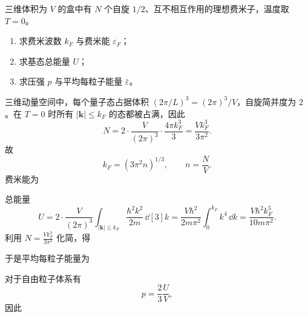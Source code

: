 \begin{question}[18分]
三维体积为 $V$ 的盒中有 $N$ 个自旋 $1/2$、互不相互作用的理想费米子，温度取 $T=0$。
\begin{enumerate}[label=(\arabic*),leftmargin=2.8em,itemsep=0.2em]
\item 求费米波数 $k_F$ 与费米能 $\varepsilon_F$；
\item 求基态总能量 $U$；
\item 求压强 $p$ 与平均每粒子能量 $\bar\varepsilon$。
\end{enumerate}
\begin{solution}

三维动量空间中，每个量子态占据体积 $(2\pi/L)^3=(2\pi)^3/V$，自旋简并度为 $2$。在 $T=0$ 时所有 $|\bm k|\le k_F$ 的态都被占满，因此
\[
N=2\cdot \frac{V}{(2\pi)^3}\cdot \frac{4\pi k_F^3}{3}
=\frac{Vk_F^3}{3\pi^2}.
\]
故
\[
k_F=(3\pi^2 n)^{1/3},\qquad n=\frac{N}{V}.
\]
费米能为

总能量
\[
U=2\cdot \frac{V}{(2\pi)^3}\int_{|\bm k|\le k_F}\frac{\hbar^2k^2}{2m}\,\dd[3]{k}
=\frac{V\hbar^2}{2m\pi^2}\int_0^{k_F}k^4\,\dd{k}
=\frac{V\hbar^2k_F^5}{10m\pi^2}.
\]
利用 $N=\frac{Vk_F^3}{3\pi^2}$ 化简，得

于是平均每粒子能量为

对于自由粒子体系有
\[
p=\frac{2}{3}\frac{U}{V},
\]
因此
\end{solution}
\end{question}

